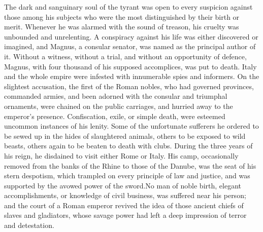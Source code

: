 The dark and sanguinary soul of the tyrant was open to every
suspicion against those among his subjects who were the most
distinguished by their birth or merit. Whenever he was alarmed
with the sound of treason, his cruelty was unbounded and
unrelenting. A conspiracy against his life was either discovered
or imagined, and Magnus, a consular senator, was named as the
principal author of it. Without a witness, without a trial, and
without an opportunity of defence, Magnus, with four thousand of
his supposed accomplices, was put to death. Italy and the whole
empire were infested with innumerable spies and informers. On the
slightest accusation, the first of the Roman nobles, who had
governed provinces, commanded armies, and been adorned with the
consular and triumphal ornaments, were chained on the public
carriages, and hurried away to the emperor’s presence.
Confiscation, exile, or simple death, were esteemed uncommon
instances of his lenity. Some of the unfortunate sufferers he
ordered to be sewed up in the hides of slaughtered animals,
others to be exposed to wild beasts, others again to be beaten to
death with clubs. During the three years of his reign, he
disdained to visit either Rome or Italy. His camp, occasionally
removed from the banks of the Rhine to those of the Danube, was
the seat of his stern despotism, which trampled on every
principle of law and justice, and was supported by the avowed
power of the sword.\footnotemark[10] No man of noble birth, elegant
accomplishments, or knowledge of civil business, was suffered
near his person; and the court of a Roman emperor revived the
idea of those ancient chiefs of slaves and gladiators, whose
savage power had left a deep impression of terror and
detestation.\footnotemark[11]



